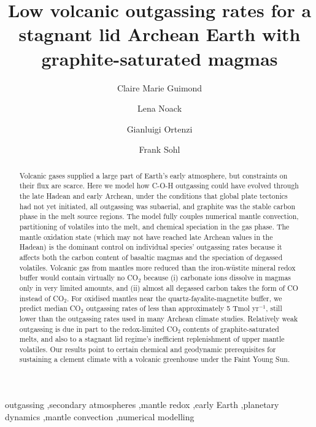 \documentclass[3p,authoryear]{elsarticle}
\newcommand{\edit}[2]{\sout{#1}\textcolor{blue}{#2}}
\newcommand{\edittwo}[2]{\textcolor{violet}{\sout{#1}#2}}
\newcommand{\editthree}[2]{\textcolor{blue}{\sout{#1}#2}}
\newcommand{\turnoffedits}{\renewcommand{\edit}[2]{##2}\renewcommand{\edittwo}[2]{##2}\renewcommand{\editthree}[2]{##2}}
\begin{document}
\turnoffedits 

\begin{frontmatter}
\title{Low volcanic outgassing rates for a stagnant lid Archean Earth with graphite-saturated magmas}
\author[fub,cam]{Claire Marie Guimond}
\author[fub]{Lena Noack}
\author[fub,dlr]{Gianluigi Ortenzi}
\author[dlr]{Frank Sohl}
\address[fub]{Freie Universit\"at Berlin, Institute of Geological Sciences, Malteserstrasse 74-100, 12249 Berlin, Germany}
\address[cam]{Bullard Laboratories, Department of Earth Sciences, University of Cambridge, Madingley Rise, Cambridge CB3 0EZ, UK}
\address[dlr]{German Aerospace Centre, Institute of Planetary Research, Rutherfordstrasse 2, 12489 Berlin, Germany}


\begin{abstract}
Volcanic gases supplied a large part of Earth's early atmosphere, but constraints on their flux are scarce. Here we model how C-O-H outgassing could have evolved through the late Hadean and early Archean, under the conditions that global plate tectonics had not yet initiated, all outgassing was subaerial, and graphite was the stable carbon phase in the melt source regions. The model fully couples numerical mantle convection, partitioning of volatiles into the melt, and chemical speciation in the gas phase. The mantle oxidation state (which may not have reached late Archean values in the Hadean) is the dominant control on individual species' outgassing rates because it affects both the carbon content of basaltic magmas and the speciation of degassed volatiles. Volcanic gas from mantles more reduced than the iron-w\"ustite mineral redox buffer would contain virtually no CO$_2$ because (i) carbonate ions dissolve in magmas only in very limited amounts, and (ii) almost all degassed carbon takes the form of CO instead of CO$_2$. For oxidised mantles near the quartz-fayalite-magnetite buffer, we predict median CO$_2$ outgassing rates of less than approximately 5 Tmol yr$^{-1}$, still lower than the outgassing rates used in many Archean climate studies. Relatively weak outgassing is due in part to the redox-limited CO$_2$ contents of graphite-saturated melts, and also to a stagnant lid regime's inefficient replenishment of upper mantle volatiles. Our results point to certain chemical and geodynamic prerequisites for sustaining a clement climate with a volcanic greenhouse under the Faint Young Sun.

\end{abstract}

\begin{keyword}
outgassing \sep secondary atmospheres \sep mantle redox \sep early Earth \sep planetary dynamics \sep mantle convection \sep numerical modelling 
\end{keyword}

\end{frontmatter}
\end{document}
